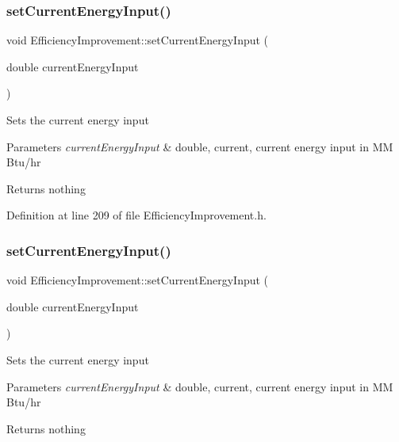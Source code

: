\subsubsection{\texorpdfstring{set\+Current\+Energy\+Input()}{setCurrentEnergyInput()}\hspace{0.1cm}{\footnotesize\ttfamily [2/3]}}
{\footnotesize\ttfamily void Efficiency\+Improvement\+::set\+Current\+Energy\+Input (\begin{DoxyParamCaption}\item[{double}]{current\+Energy\+Input }\end{DoxyParamCaption})\hspace{0.3cm}{\ttfamily [inline]}}

Sets the current energy input


\begin{DoxyParams}{Parameters}
{\em current\+Energy\+Input} & double, current, current energy input in MM Btu/hr\\
\hline
\end{DoxyParams}
\begin{DoxyReturn}{Returns}
nothing 
\end{DoxyReturn}


Definition at line 209 of file Efficiency\+Improvement.\+h.

\mbox{\label{class_efficiency_improvement_a72c247fcd3f7791566205ec783e13d81}} 
\subsubsection{\texorpdfstring{set\+Current\+Energy\+Input()}{setCurrentEnergyInput()}\hspace{0.1cm}{\footnotesize\ttfamily [3/3]}}
{\footnotesize\ttfamily void Efficiency\+Improvement\+::set\+Current\+Energy\+Input (\begin{DoxyParamCaption}\item[{double}]{current\+Energy\+Input }\end{DoxyParamCaption})\hspace{0.3cm}{\ttfamily [inline]}}

Sets the current energy input


\begin{DoxyParams}{Parameters}
{\em current\+Energy\+Input} & double, current, current energy input in MM Btu/hr\\
\hline
\end{DoxyParams}
\begin{DoxyReturn}{Returns}
nothing 
\end{DoxyReturn}


